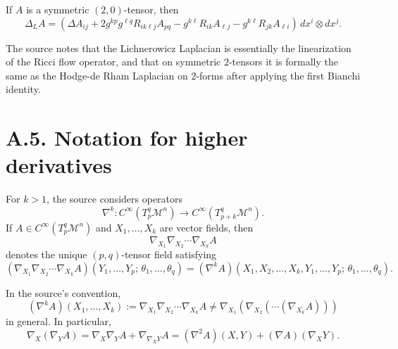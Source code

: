 \begin{remark}
\label{appa-rem-lichnerowicz-laplacian-components}
If \(A\) is a symmetric \((2,0)\)-tensor, then
\[
\Delta_L A
= \left(\Delta A_{ij} + 2g^{kp}g^{\ell q}R_{ik\ell j}A_{pq} - g^{k\ell}R_{ik}A_{\ell j} - g^{k\ell}R_{jk}A_{\ell i}\right)\, dx^i \otimes dx^j .
\]
\end{remark}

\begin{remark}
\label{appa-rem-lichnerowicz-hodge-comparison}
The source notes that the Lichnerowicz Laplacian is essentially the linearization of the Ricci flow operator, and that on symmetric \(2\)-tensors it is formally the same as the Hodge-de Rham Laplacian on \(2\)-forms after applying the first Bianchi identity.
\end{remark}

\section*{A.5. Notation for higher derivatives}

\begin{definition}
\label{appa-def-higher-covariant-derivatives}
For \(k>1\), the source considers operators
\[
\nabla^k : C^\infty\!\left(T^q_p \mathcal M^n\right) \to C^\infty\!\left(T^q_{p+k} \mathcal M^n\right).
\]
If \(A\in C^\infty(T^q_p \mathcal M^n)\) and \(X_1,\ldots,X_k\) are vector fields, then
\[
\nabla_{X_1}\nabla_{X_2}\cdots\nabla_{X_k}A
\]
denotes the unique \((p,q)\)-tensor field satisfying
\[
(\nabla_{X_1}\nabla_{X_2}\cdots\nabla_{X_k}A)(Y_1,\ldots,Y_p;\,\theta_1,\ldots,\theta_q)
= (\nabla^k A)(X_1,X_2,\ldots,X_k,Y_1,\ldots,Y_p;\,\theta_1,\ldots,\theta_q).
\]
\end{definition}

\begin{remark}
\label{appa-rem-iterated-vs-nested-covariant-derivatives}
In the source's convention,
\[
(\nabla^k A)(X_1,\ldots,X_k):=\nabla_{X_1}\nabla_{X_2}\cdots\nabla_{X_k}A \neq \nabla_{X_1}(\nabla_{X_2}(\cdots(\nabla_{X_k}A)))
\]
in general. In particular,
\[
\nabla_X(\nabla_YA)=\nabla_X\nabla_YA+\nabla_{\nabla_XY}A=(\nabla^2A)(X,Y)+(\nabla A)(\nabla_XY).
\]
\end{remark}

